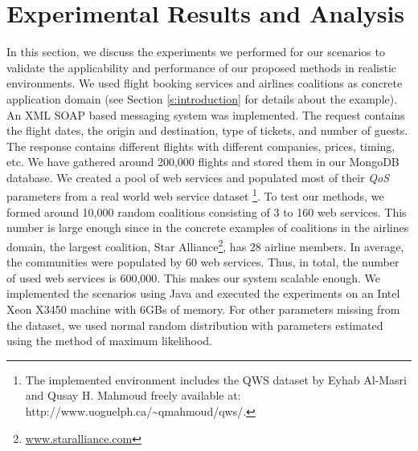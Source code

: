 \documentclass[10pt,journal,cspaper,compsoc]{IEEEtran}
\begin{document}




\section{Experimental Results and Analysis}\label{s:resutls}

In this section, we discuss the experiments we performed for our
scenarios to validate the applicability and performance of our
proposed methods in realistic environments. We used flight booking
services and airlines coalitions as concrete application domain
(see Section \ref{s:introduction} for details about the example).
An XML SOAP based messaging system was implemented. The request
contains the flight dates, the origin and destination, type of
tickets, and number of guests. The response contains different
flights with different companies, prices, timing, etc. We have
gathered around 200,000 flights and stored them in our MongoDB
database. We created a pool of web services and populated most of
their \emph{QoS} parameters from a real world web service dataset
\cite{DBLP:conf/smc/Al-MasriM09a}\footnote[1]{The implemented
environment includes the QWS dataset by Eyhab Al-Masri and Qusay
H. Mahmoud freely available at:
http://www.uoguelph.ca/\textasciitilde{}qmahmoud/qws/.}. To test
our methods, we formed around 10,000 random coalitions consisting
of 3 to 160 web services. This number is large enough since in the
concrete examples of coalitions in the airlines domain, the
largest coalition, Star
Alliance\footnote{\url{www.staralliance.com}}, has 28 airline
members. In average, the communities were populated by 60 web
services. Thus, in total, the number of used web services is
600,000. This makes our system scalable enough. We implemented the
scenarios using Java and executed the experiments on an Intel Xeon
X3450 machine with 6GBs of memory. For other parameters missing
from the dataset, we used normal random distribution with
parameters estimated using the method of maximum likelihood.
\end{document}
